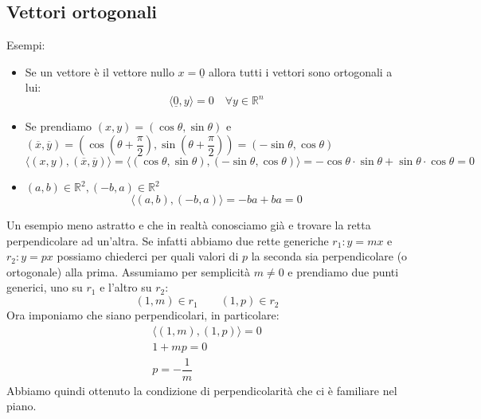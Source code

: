 \subsection{Vettori ortogonali} \label{sec_ortogonalita}
Esempi:
\begin{itemize}
	\item Se un vettore è il vettore nullo $x = \underline{0}$ allora tutti i 
        vettori sono ortogonali a lui:
		\begin{equation*}
			\langle \underline{0}, y \rangle = 0 \quad \forall y \in 
            \mathbb{R}^n
		\end{equation*}
	
	\item Se prendiamo $(x, y) = (\cos{\theta}, \sin{\theta})$ e 
        $(\overline{x}, \overline{y}) = \left(\cos(\theta + \dfrac{\pi}{2}), 
        \sin(\theta + \dfrac{\pi}{2}) \right) = (-\sin{\theta}, 
        \cos{\theta})$
		\begin{equation*}
			\langle (x, y), (\overline{x}, \overline{y}) \rangle = 
            \langle (\cos{\theta}, \sin{\theta}), (-\sin{\theta}, 
            \cos{\theta}) \rangle = -\cos{\theta} \cdot \sin{\theta} + 
            \sin{\theta} \cdot \cos{\theta} = 0
		\end{equation*}
	
	\item $(a, b) \in \mathbb{R}^2, (-b, a ) \in \mathbb{R}^2$
		\begin{equation*}
			\langle (a, b), (-b, a) \rangle = -ba + ba = 0
		\end{equation*}
\end{itemize}
Un esempio meno astratto e che in realtà conosciamo già e trovare la retta 
perpendicolare ad un'altra. Se infatti abbiamo due rette generiche 
$r_1: y = mx$ e $r_2: y = px$ possiamo chiederci per quali valori di $p$ la 
seconda sia perpendicolare (o ortogonale) alla prima. Assumiamo per semplicità 
$m \neq 0$ e prendiamo due punti generici, uno su $r_1$ e l'altro su $r_2$:
\begin{equation*}
	(1, m) \in r_1 \qquad (1, p) \in r_2
\end{equation*}
Ora imponiamo che siano perpendicolari, in particolare:
\begin{gather*}
	\langle (1, m), (1, p) \rangle = 0\\[10pt]
	1 + mp = 0 \\[10pt]
	p = -\dfrac{1}{m}
\end{gather*}
Abbiamo quindi ottenuto la condizione di perpendicolarità che ci è familiare 
nel piano.

